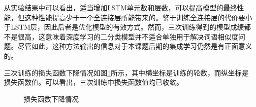 从实验结果中可以看出，适当增加LSTM单元数和层数，可以提高模型的最终性能，但这种性能提高少于一个全连接层所能带来的。鉴于训练全连接层的代价要小于LSTM层，因此后者是优化模型的有效方式。然而，三次训练得到的模型成绩都不是很高，这意味着深度学习的二分类模型并不适合单独用于解决词语相似度问题。尽管如此，这种方法输出的信息对于本课题后期的集成学习仍然是有正面意义的。

三次训练的损失函数下降情况如图\ref{f:classifer loss}所示，其中横坐标是训练的轮数，而纵坐标是损失函数值。可以看出，三次训练中损失函数值均已收敛。

\begin{figure}[h]
	\centering
	\caption{损失函数下降情况}
	\label{f:classifer loss}
	\vspace{-1em}
\end{figure}